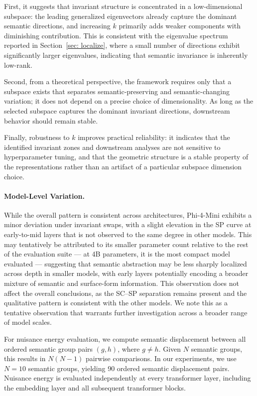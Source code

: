 First, it suggests that invariant structure is concentrated in a low-dimensional subspace: the leading generalized eigenvectors already capture the dominant semantic directions, and increasing $k$ primarily adds weaker components with diminishing contribution. This is consistent with the eigenvalue spectrum reported in Section~\ref{sec: localize}, where a small number of directions exhibit significantly larger eigenvalues, indicating that semantic invariance is inherently low-rank.

Second, from a theoretical perspective, the framework requires only that a subspace exists that separates semantic-preserving and semantic-changing variation; it does not depend on a precise choice of dimensionality. As long as the selected subspace captures the dominant invariant directions, downstream behavior should remain stable.

Finally, robustness to $k$ improves practical reliability: it indicates that the identified invariant zones and downstream analyses are not sensitive to hyperparameter tuning, and that the geometric structure is a stable property of the representations rather than an artifact of a particular subspace dimension choice.

\paragraph{Model-Level Variation.}
While the overall pattern is consistent across architectures, Phi-4-Mini exhibits a minor deviation under invariant swaps, with a slight elevation in the SP curve at early-to-mid layers that is not observed to the same degree in other models. This may tentatively be attributed to its smaller parameter count relative to the rest of the evaluation suite — at 4B parameters, it is the most compact model evaluated — suggesting that semantic abstraction may be less sharply localized across depth in smaller models, with early layers potentially encoding a broader mixture of semantic and surface-form information. This observation does not affect the overall conclusions, as the SC–SP separation remains present and the qualitative pattern is consistent with the other models. We note this as a tentative observation that warrants further investigation across a broader range of model scales.




For nuisance energy evaluation, we compute semantic displacement between all ordered semantic group pairs \((g,h)\), where \(g \neq h\). Given \(N\) semantic groups, this results in \(N(N-1)\) pairwise comparisons. In our experiments, we use \(N=10\) semantic groups, yielding 90 ordered semantic displacement pairs. Nuisance energy is evaluated independently at every transformer layer, including the embedding layer and all subsequent transformer blocks.

